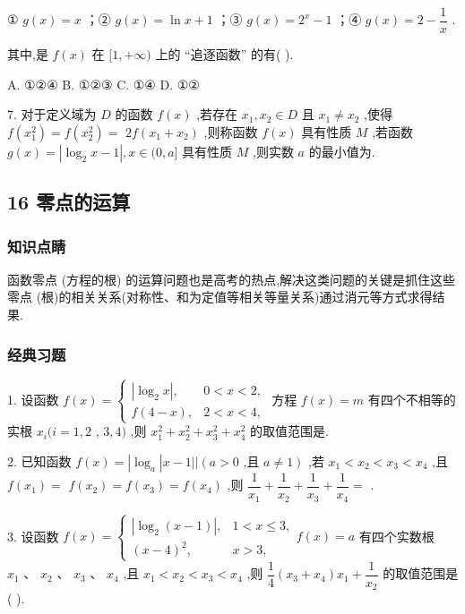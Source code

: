 ① $g\left( x\right)  = x$ ；② $g\left( x\right)  = \ln x + 1$ ；③ $g\left( x\right)  = {2}^{x} - 1$ ；④ $g\left( x\right)  = 2 - \dfrac{1}{x}$ .

其中,是 $f\left( x\right)$ 在 $\lbrack 1, + \infty )$ 上的 “追逐函数” 的有(   ).

A. ①②④ B. ①②③ C. ①④ D. ①②

7. 对于定义域为 $D$ 的函数 $f\left( x\right)$ ,若存在 ${x}_{1},{x}_{2} \in  D$ 且 ${x}_{1} \neq  {x}_{2}$ ,使得 $f\left( {x}_{1}^{2}\right)  = f\left( {x}_{2}^{2}\right)  =$  ${2f}\left( {{x}_{1} + {x}_{2}}\right)$ ,则称函数 $f\left( x\right)$ 具有性质 $M$ ,若函数 $g\left( x\right)  = \left| {{\log }_{2}x - 1}\right| ,x \in  (0,a\rbrack$ 具有性质 $M$ ,则实数 $a$ 的最小值为\blkda{}.

\subsection*{16 零点的运算}

\subsubsection*{知识点睛}

函数零点 (方程的根) 的运算问题也是高考的热点,解决这类问题的关键是抓住这些零点 (根)的相关关系(对称性、和为定值等相关等量关系)通过消元等方式求得结果.

\subsubsection*{经典习题}

1. 设函数 $f\left( x\right)  = \left\{  \begin{array}{ll} \left| {{\log }_{2}x}\right| , & 0 < x < 2, \\  f\left( {4 - x}\right) , & 2 < x < 4, \end{array}\right.$ 方程 $f\left( x\right)  = m$ 有四个不相等的实根 ${x}_{i}(i = 1,2$ , $3,4)$ ,则 ${x}_{1}^{2} + {x}_{2}^{2} + {x}_{3}^{2} + {x}_{4}^{2}$ 的取值范围是\blkda{}.

2. 已知函数 $f\left( x\right)  = \left| {\log }_{a}\right| x - 1\left| \right| \left( {a > 0\text{ ,且 }a \neq  1}\right)$ ,若 ${x}_{1} < {x}_{2} < {x}_{3} < {x}_{4}$ ,且 $f\left( {x}_{1}\right)  =$  $f\left( {x}_{2}\right)  = f\left( {x}_{3}\right)  = f\left( {x}_{4}\right)$ ,则 $\dfrac{1}{{x}_{1}} + \dfrac{1}{{x}_{2}} + \dfrac{1}{{x}_{3}} + \dfrac{1}{{x}_{4}} =$ \blkda{}.

3. 设函数 $f\left( x\right)  = \left\{  {\begin{array}{ll} \left| {{\log }_{2}\left( {x - 1}\right) }\right| , & 1 < x \leq  3, \\  {\left( x - 4\right) }^{2}, & x > 3, \end{array}f\left( x\right)  = a}\right.$ 有四个实数根 ${x}_{1}\text{ 、 }{x}_{2}\text{ 、 }{x}_{3}\text{ 、 }{x}_{4}$ ,且 ${x}_{1} < {x}_{2} < {x}_{3} < {x}_{4}$ ,则 $\dfrac{1}{4}\left( {{x}_{3} + {x}_{4}}\right) {x}_{1} + \dfrac{1}{{x}_{2}}$ 的取值范围是(   ).

